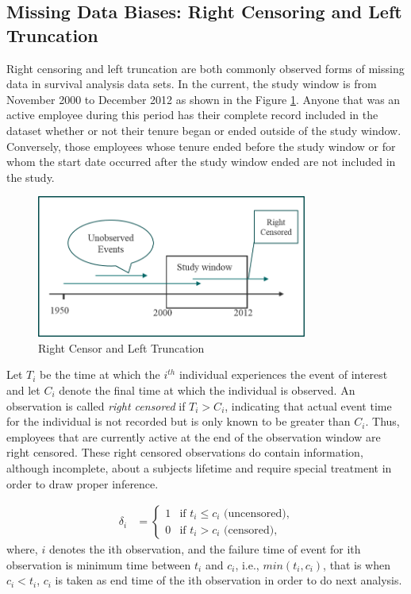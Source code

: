 \documentclass[12pt,letterpaper]{article}
\begin{document}
 \subsection{Missing Data Biases: Right Censoring and Left Truncation}\label{bias}
 Right censoring and left truncation are both commonly observed forms of missing data in survival analysis data sets. In the current, the study window is from November 2000 to December 2012 as shown in the Figure \ref{fig:1}.  Anyone that was an active employee during this period has their complete record included in the dataset whether or not their tenure began or ended outside of the study window.  Conversely, those employees whose tenure ended before the study window or for whom the start date occurred after the study window ended are not included in the study.

 \begin{figure}[htbp]
 	\centering
 	\includegraphics[width=3.5in]{fig1.png}
 	\caption{Right Censor and Left Truncation}
 	\label{fig:1}
 \end{figure}
  Let $T_i$ be the time at which the $i^{th}$ individual experiences the event of interest and let $C_i$ denote the final time at which the individual is observed. An observation is called {\it right censored} if $T_i> C_i$, indicating that actual event time for the individual  is not recorded but is only known to be greater than $C_i$. Thus, employees that are currently active at the end of the observation window are right censored. These right censored observations do contain information, although incomplete, about a subjects lifetime and require special treatment in order to draw proper inference.

 \begin{align*}
 	\delta_i&=
 	\begin{cases}
 		1   &\text{if  }  t_i \leq c_i \text{ (uncensored),}\\
 		0   &\text{if  }  t_i > c_i \text{ (censored),}
 	\end{cases}
 \end{align*}
 where, $i$ denotes the ith observation, and the failure time of event for ith observation is minimum time between $t_i$ and $c_i$, i.e., $min(t_i, c_i)$, that is when $ c_i <t_i $, $c_i$ is taken as end time of the ith observation in order to do next  analysis.
\end{document}
